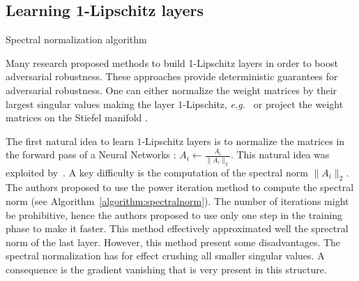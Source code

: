  

\subsection{Learning 1-Lipschitz layers}


\begin{algorithm}[tb]
  \caption{Spectral normalization algorithm}
  \label{algorithm:spectralnorm}
  \begin{algorithmic}
  \end{algorithmic}
  \end{algorithm}
Many research proposed methods to build 1-Lipschitz layers in order to boost adversarial robustness. These approaches provide deterministic guarantees for adversarial robustness. One can either normalize the weight matrices by their largest singular values making the layer $1$-Lipschitz, \emph{e.g.}~\citep{yoshida2017spectral,miyato2018spectral,farnia2018generalizable,anil2019sorting} or project the weight matrices on the Stiefel manifold \citep{li2019preventing,trockman2021orthogonalizing,skew2021sahil}.

The first natural idea to learn $1$-Lipschitz layers is to normalize the matrices in the forward pass of a Neural Networks : $A_i\leftarrow \frac{A_i}{\lVert A_i\rVert_2}$. This natural idea was exploited by~\citet{miyato2018spectral}. A key difficulty is the computation of the spectral norm $\lVert A_i\rVert_2$. The authors proposed to use the power iteration method to compute the spectral norm (see Algorithm~\ref{algorithm:spectralnorm}). The number of iterations might be prohibitive, hence the authors proposed to use only one step in the training phase to make it faster. This method effectively approximated well the sprectral norm of the last layer. However, this method present some disadvantages. The spectral normalization has for effect crushing all smaller singular values. A consequence is the gradient vanishing that is very present in this structure. 

